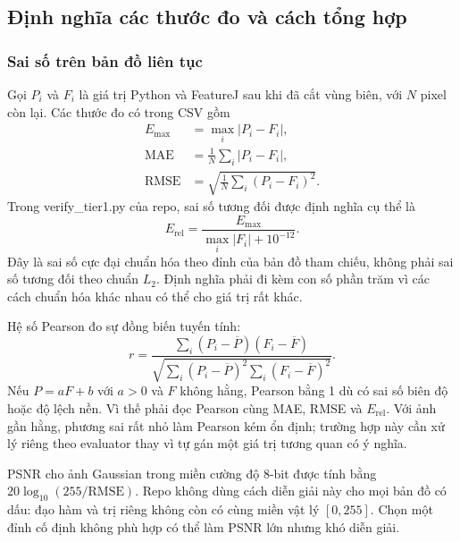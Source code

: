 \subsection{Định nghĩa các thước đo và cách tổng hợp}
\label{sec:metrics}
\subsubsection{Sai số trên bản đồ liên tục}
Gọi $P_i$ và $F_i$ là giá trị Python và FeatureJ sau khi đã cắt vùng biên, với $N$ pixel còn lại. Các thước đo có trong CSV gồm
\begin{align}
E_{\max}&=\max_i|P_i-F_i|,\\
\mathrm{MAE}&=\frac1N\sum_i|P_i-F_i|,\\
\mathrm{RMSE}&=\sqrt{\frac1N\sum_i(P_i-F_i)^2}.
\end{align}
Trong verify\_tier1.py của repo, sai số tương đối được định nghĩa cụ thể là
\begin{equation}
E_{\mathrm{rel}}=\frac{E_{\max}}{\max_i|F_i|+10^{-12}}.
\label{eq:relmax}
\end{equation}
Đây là sai số cực đại chuẩn hóa theo đỉnh của bản đồ tham chiếu, không phải sai số tương đối theo chuẩn $L_2$. Định nghĩa phải đi kèm con số phần trăm vì các cách chuẩn hóa khác nhau có thể cho giá trị rất khác.

Hệ số Pearson đo sự đồng biến tuyến tính:
\begin{equation}
r=\frac{\sum_i(P_i-\overline P)(F_i-\overline F)}
{\sqrt{\sum_i(P_i-\overline P)^2\sum_i(F_i-\overline F)^2}}.
\end{equation}
Nếu $P=aF+b$ với $a>0$ và $F$ không hằng, Pearson bằng 1 dù có sai số biên độ hoặc độ lệch nền. Vì thế phải đọc Pearson cùng MAE, RMSE và $E_{\mathrm{rel}}$. Với ảnh gần hằng, phương sai rất nhỏ làm Pearson kém ổn định; trường hợp này cần xử lý riêng theo evaluator thay vì tự gán một giá trị tương quan có ý nghĩa.

PSNR cho ảnh Gaussian trong miền cường độ 8-bit được tính bằng $20\log_{10}(255/\mathrm{RMSE})$. Repo không dùng cách diễn giải này cho mọi bản đồ có dấu: đạo hàm và trị riêng không còn có cùng miền vật lý $[0,255]$. Chọn một đỉnh cố định không phù hợp có thể làm PSNR lớn nhưng khó diễn giải.

